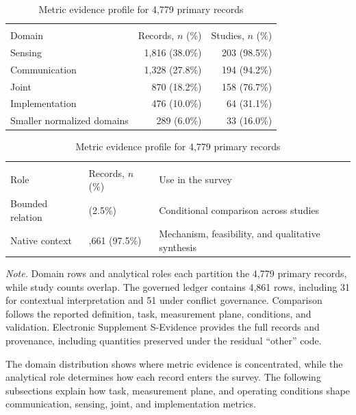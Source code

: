\begin{table}[!htbp]
\caption{Metric evidence profile for 4,779 primary records}
\label{tab:metric_admissibility}
\centering
\footnotesize
\setlength{\tabcolsep}{3.5pt}
\renewcommand{\arraystretch}{1.04}
\begin{tabularx}{\columnwidth}{@{}>{\raggedright\arraybackslash}X r r@{}}
\toprule
\multicolumn{3}{@{}l}{\emph{Metric domains}} \\
\addlinespace[1pt]
Domain & Records, $n$ (\%) & Studies, $n$ (\%) \\
\midrule
Sensing & 1,816 (38.0\%) & 203 (98.5\%) \\
Communication & 1,328 (27.8\%) & 194 (94.2\%) \\
Joint & 870 (18.2\%) & 158 (76.7\%) \\
Implementation & 476 (10.0\%) & 64 (31.1\%) \\
Smaller normalized domains & 289 (6.0\%) & 33 (16.0\%) \\
\bottomrule
\end{tabularx}

\vspace{3pt}
\begin{tabularx}{\columnwidth}{@{}>{\raggedright\arraybackslash}p{}
>{\raggedleft\arraybackslash}p{}
>{\raggedright\arraybackslash}X@{}}
\toprule
\multicolumn{3}{@{}l}{\emph{Analytical roles}} \\
\addlinespace[1pt]
Role & Records, $n$ (\%) & Use in the survey \\
\midrule
Bounded relation & 118 (2.5\%) & Conditional comparison across studies \\
Native context & 4,661 (97.5\%) & Mechanism, feasibility, and qualitative
synthesis \\
\bottomrule
\end{tabularx}
\vspace{1pt}
\parbox{\columnwidth}{\footnotesize\emph{Note.} Domain rows and analytical
roles each partition the 4,779 primary records, while study counts overlap. The
governed ledger contains 4,861 rows, including 31 for contextual interpretation
and 51 under conflict governance. Comparison follows the reported definition,
task, measurement plane, conditions, and validation. Electronic Supplement
S-Evidence provides the full records and provenance, including quantities
preserved under the residual ``other'' code.}
\end{table}

The domain distribution shows where metric evidence is concentrated, while the
analytical role determines how each record enters the survey. The following
subsections explain how task, measurement plane, and operating conditions shape
communication, sensing, joint, and implementation metrics.

